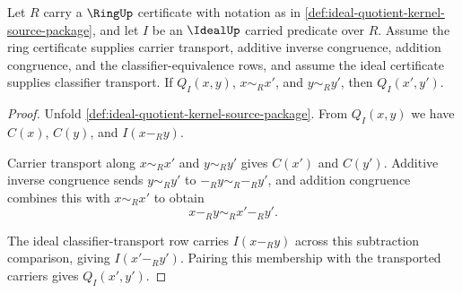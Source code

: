 \begin{theorem}
\label{thm:ideal-quotient-kernel-transport-surface}
Let $R$ carry a $\RingUp$ certificate with notation as in \autoref{def:ideal-quotient-kernel-source-package}, and let $I$ be an $\IdealUp$ carried predicate over $R$. Assume the ring certificate supplies carrier transport, additive inverse congruence, addition congruence, and the classifier-equivalence rows, and assume the ideal certificate supplies classifier transport. If $Q_I(x,y)$, $x\sim_R x'$, and $y\sim_R y'$, then $Q_I(x',y')$.
\end{theorem}
\begin{proof}
Unfold \autoref{def:ideal-quotient-kernel-source-package}. From $Q_I(x,y)$ we have $C(x)$, $C(y)$, and $I(x-_R y)$.

Carrier transport along $x\sim_R x'$ and $y\sim_R y'$ gives $C(x')$ and $C(y')$. Additive inverse congruence sends $y\sim_R y'$ to $-_R y\sim_R -_R y'$, and addition congruence combines this with $x\sim_R x'$ to obtain
$$
x-_R y\sim_R x'-_R y'.
$$

The ideal classifier-transport row carries $I(x-_R y)$ across this subtraction comparison, giving $I(x'-_R y')$. Pairing this membership with the transported carriers gives $Q_I(x',y')$.
\end{proof}

